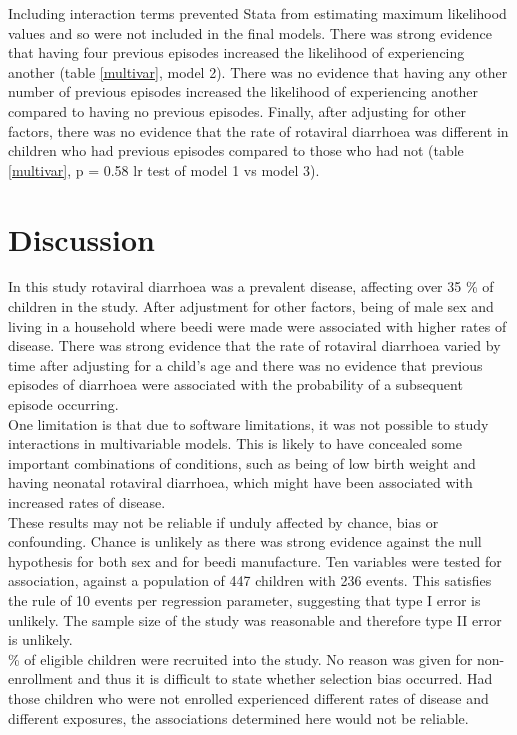 \documentclass[11pt,a4paper]{article}\usepackage{graphicx, color}
\begin{document}
Including interaction terms prevented Stata from estimating maximum likelihood values and so were not included in the final models. 
There was strong evidence that having four previous episodes increased the likelihood of experiencing another (table \ref{multivar}, model 2). 
There was no evidence that having any other number of previous episodes increased the likelihood of experiencing another compared to having no previous episodes. 
Finally, after adjusting for other factors, there was no evidence that the rate of rotaviral diarrhoea was different in children who had previous episodes compared to those who had not (table \ref{multivar}, p = 0.58 lr test of model 1 vs model 3). \\
%
\section{Discussion}
\indent In this study rotaviral diarrhoea was a prevalent disease, affecting over 35 \% of children in the study. 
After adjustment for other factors, being of male sex and living in a household where beedi were made were associated with higher rates of disease.  
There was strong evidence that the rate of rotaviral diarrhoea varied by time after adjusting for a child's age and there was no evidence that previous episodes of diarrhoea were associated with the probability of a subsequent episode occurring. \\
\indent One limitation is that due to software limitations, it was not possible to study interactions in multivariable models. 
This is likely to have concealed some important combinations of conditions, such as being of low birth weight and having neonatal rotaviral diarrhoea, which might have been associated with increased rates of disease. \\
\indent These results may not be reliable if unduly affected by chance, bias or confounding. 
Chance is unlikely as there was strong evidence against the null hypothesis for both sex and for beedi manufacture. 
Ten variables were tested for association, against a population of 447 children with 236 events. This satisfies the rule of 10 events per regression parameter, suggesting that type I error is unlikely. 
The sample size of the study was reasonable and therefore type II error is unlikely. \\
 \% of eligible children were recruited into the study.
No reason was given for non-enrollment and thus it is difficult to state whether selection bias occurred. 
Had those children who were not enrolled experienced different rates of disease and different exposures, the associations determined here would not be reliable. 
\end{document}
